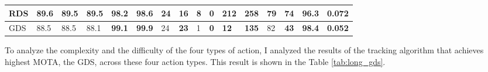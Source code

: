 \begin{table}[]
{\begin{tabular}{|l|l|l|l|l|l|l|l|l|l|l|l|l|l|l|l|}
			RDS    & \textbf{89.6} & \textbf{89.5} & \textbf{89.5} & 98.2                                                   & 98.6                                                   & 24   & 16                                                   & 8                                                    & \textbf{0}                                           & 212                                                  & 258                                                  & 79                                                    & 74                                                   & 96.3          & 0.072          \\ \hline
			GDS    & 88.5          & 88.5          & 88.1          & \textbf{99.1}                                          & \textbf{99.9}                                          & 24   & \textbf{23}                                          & 1                                                    & \textbf{0}                                           & \textbf{12}                                          & \textbf{135}                                         & 82                                                    & \textbf{43}                                          & \textbf{98.4} & \textbf{0.052} \\ \hline
		\end{tabular}%
	}
\end{table}
To analyze the complexity and the difficulty of the four types of action, I analyzed the results of the tracking algorithm that achieves highest MOTA, the GDS, across these four action types. This result is shown in the Table \ref{tab:long_gds}.
